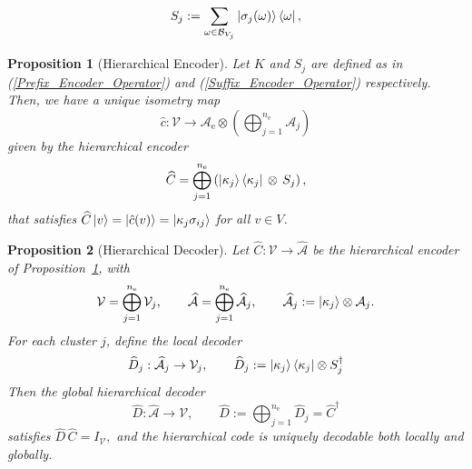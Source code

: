 \documentclass[10pt,a4paper]{amsart}
\newtheorem{proposition}{Proposition}
\begin{document}
\begin{equation}
    {S_j}
    := \sum_{\omega \in \mathcal{B}_{V_j}} \ket{\sigma_j(\omega)}\bra{\omega}, \label{Suffix_Encoder_Operator}
\end{equation}

\begin{proposition}[Hierarchical Encoder]\label{proposition encoder}
Let ${K}$ and ${S}_j$ are defined as in (\ref{Prefix_Encoder_Operator}) and (\ref{Suffix_Encoder_Operator}) respectively.
Then, we have a unique isometry map
\[ \hat{c} : \mathcal{V} \to \mathcal{A}_{\mathrm{e}} \otimes\left( \bigoplus_{j=1}^{n_{\mathrm{e}}} \mathcal{A}_j\right)\] 
given by the hierarchical encoder
\[
    \widehat{C} = \bigoplus_{j=1}^{n_\mathrm{e}} \left(\ket{\kappa_j}\bra{\kappa_j}   \,\otimes\, {S}_j\right),
\]
that satisfies
$\widehat{C}\ket{v} = \ket{\hat{c}(v)}=\ket{\kappa_j \sigma_{ij}}$ for all $v \in V$.
\end{proposition}

\begin{proposition}[Hierarchical Decoder]\label{proposition decoder}
Let $\widehat{C} : \mathcal{V} \to \widehat{\mathcal{A}}$ be the hierarchical encoder of Proposition~\ref{proposition encoder}, with
\[
  \mathcal{V} = \bigoplus_{j=1}^{n_{\mathrm{e}}} \mathcal{V}_j,
  \qquad
  \widehat{\mathcal{A}}
    = \bigoplus_{j=1}^{n_{\mathrm{e}}} \widehat{\mathcal{A}}_j,
  \qquad
  \widehat{\mathcal{A}}_j := \ket{\kappa_j} \otimes \mathcal{A}_j.
\]
For each cluster $j$, define the local decoder
\begin{align*}
\widehat{D}_j: \widehat{\mathcal{A}}_j \to \mathcal{V}_j, \qquad 
  \widehat{D}_j
    := \ket{\kappa_j}\bra{\kappa_j} \otimes {S}_j^\dagger    
\end{align*}
Then the global hierarchical decoder
\[
  \widehat{D} : \widehat{\mathcal{A}} \to \mathcal{V}, \qquad
    \widehat{D} := \bigoplus_{j=1}^{n_{\mathrm{e}}} \widehat{D}_j
    = \widehat{C}^\dagger    
\]
satisfies $\widehat{D}\,\widehat{C} = I_{\mathcal{V}},$
and the hierarchical code is uniquely decodable both locally and globally.
\end{proposition}
\end{document}
